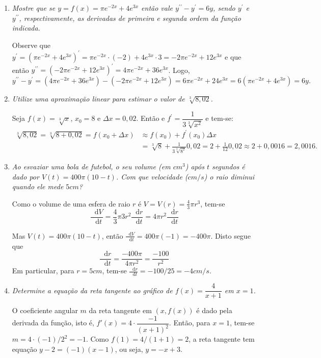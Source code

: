 \documentclass[12pt,a4paper]{article}
\newcommand*\diff{\mathop{}\!\mathrm{d}}
\begin{document}
\begin{enumerate}
\item \textit{Mostre que se $y = f(x) = \pi e^{-2x} + 4e^{3x}$ então vale $y^{\prime \prime} - y^\prime = 6 y$, sendo $y^\prime$ e $y^{\prime\prime}$, respectivamente, as derivadas de primeira e segunda ordem da função indicada.}

Observe que $y^\prime = (\pi e^{-2x} + 4e^{3x})^\prime = \pi e^{-2x} \cdot (-2) + 4 e^{3x} \cdot 3 = -2 \pi e^{-2x} + 12 e^{3x}$ e que então $y^{\prime\prime} = (-2 \pi e^{-2x} + 12 e^{3x})^\prime = 4 \pi e^{-2x} + 36 e^{3x}$. Logo,
\[
y^{\prime \prime} - y^\prime
= (4 \pi e^{-2x} + 36 e^{3x})-(-2 \pi e^{-2x} + 12 e^{3x})
= 6 \pi e^{-2x} + 24 e^{3x}
= 6 (\pi e^{-2x} + 4 e^{3x})
= 6 y.
\]



\item \textit{Utilize uma aproximação linear para estimar o valor de $\sqrt[3]{8,02}$.}

Seja $f(x) = \sqrt[3]{x}$, $x_0 = 8$ e $\Delta x = 0,02$. Então e $f^\prime = \dfrac{1}{3\sqrt[3]{x^2}}$ e tem-se:
\begin{align*}
\sqrt[3]{8,02} = \sqrt[3]{8 + 0,02}
= f(x_0+\Delta x)
& \approx f(x_0) + f^{\prime}(x_0)\Delta x \\
& = \sqrt[3]{8} + \frac{1}{3\sqrt[3]{8^2}}0,02
= 2 + \frac{1}{12}0,02
\approx 2 + 0,0016
= 2,0016.
\end{align*}



\item \textit{Ao esvaziar uma bola de futebol, o seu volume (em $cm^3$) após $t$ segundos é dado por $V(t) = 400 \pi (10 - t)$. Com que velocidade ($cm/s$) o raio diminui quando ele mede $5cm$?}

Como o volume de uma esfera de raio $r$ é $V = V(r) = \frac{4}{3} \pi r^3$, tem-se
\[
\frac{\diff{V}}{\diff{t}}
= \frac{4}{3} \pi 3 r^2 \frac{\diff{r}}{\diff{t}}
= 4 \pi r^2 \frac{\diff{r}}{\diff{t}}
\]

Mas $V(t) = 400 \pi (10 - t)$, então $\frac{\diff{V}}{\diff{t}} = 400 \pi (-1) = -400 \pi$. Disto segue que
\[
\frac{\diff{r}}{\diff{t}}
= \frac{ -400 \pi }{ 4 \pi r^2 }
= \frac{ -100 }{ r^2 }
\]
Em particular, para $r = 5cm$, tem-se $\frac{\diff{r}}{\diff{t}} = -100/25 = -4 cm/s$.

\item \textit{Determine a equação da reta tangente ao gráfico de $f(x) = \dfrac{4}{x + 1}$ em $x = 1$.}

O coeficiente angular $m$ da reta tangente em $(x, f(x))$ é dado pela derivada da função, isto é, $f'(x) = 4 \cdot \dfrac{-1}{(x + 1)^2}$. Então, para $x=1$, tem-se $m=4 \cdot (-1)/2^2 = -1$. Como $f(1) = 4/(1+1) = 2$, a reta tangente tem equação $y - 2 = (-1)(x-1)$, ou seja, $y=-x+3$.


\end{enumerate}
\end{document}
